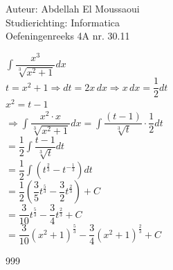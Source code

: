 \documentclass[a4paper]{article}
\begin{document}
  
\noindent \large Auteur: Abdellah El Moussaoui \\
\noindent \large Studierichting: Informatica\\
\noindent \large Oefeningenreeks 4A nr. 30.11\\

\medskip

\normalsize

$\displaystyle\int \dfrac{x^3}{\sqrt[3]{x^2 + 1}}dx$\\

$t=x^2+1 \Rightarrow dt=2x\,dx \Rightarrow x\,dx=\dfrac{1}{2}dt$\\

$x^2=t-1$\\

$\Rightarrow \displaystyle\int \dfrac{x^2 \cdot x}{\sqrt[3]{x^2+1}}dx=\displaystyle\int \dfrac{\left( t-1 \right)}{\sqrt[3]{t}} \cdot \dfrac{1}{2}dt$\\

$= \dfrac{1}{2} \displaystyle\int \dfrac{t-1}{\sqrt[3]{t}}dt$\\

$= \dfrac{1}{2} \displaystyle\int \left( t^{\tfrac{2}{3}}-t ^ {-\tfrac{1}{3}} \right)dt$\\

$=\dfrac{1}{2}\left( \dfrac{3}{5}t^{\tfrac{5}{3}}-\dfrac{3}{2}t ^{\tfrac{2}{3}} \right)+C$\\

$= \dfrac{3}{10}t^{\tfrac{5}{3}}-\dfrac{3}{4}t^{\tfrac{2}{3}}+C$\\

$= \dfrac{3}{10}\left( x^2+1 \right)^{\tfrac{5}{3}}-\dfrac{3}{4}\left( x^2+1 \right)^{\tfrac{2}{3}}+C$\\



\begin{thebibliography}{999}
\end{thebibliography}
\end{document}
